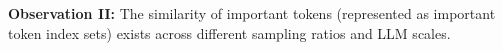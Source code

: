 
\noindent
\textbf{Observation II:}{
	The similarity of important tokens (represented as important token index sets) exists across different sampling ratios and LLM scales.
}


